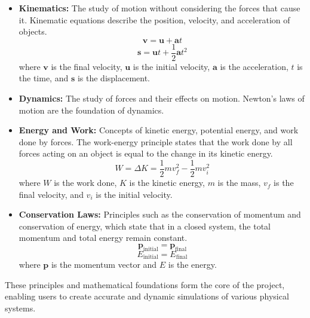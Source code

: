 \begin{itemize}
    \item \textbf{Kinematics:} The study of motion without considering the forces that cause it. Kinematic equations describe the position, velocity, and acceleration of objects.
    \begin{equation}
        \mathbf{v} = \mathbf{u} + \mathbf{a} t
    \end{equation}
    \begin{equation}
        \mathbf{s} = \mathbf{u} t + \frac{1}{2} \mathbf{a} t^2
    \end{equation}
    where \(\mathbf{v}\) is the final velocity, \(\mathbf{u}\) is the initial velocity, \(\mathbf{a}\) is the acceleration, \(t\) is the time, and \(\mathbf{s}\) is the displacement.
    
    \item \textbf{Dynamics:} The study of forces and their effects on motion. Newton's laws of motion are the foundation of dynamics.
    
    \item \textbf{Energy and Work:} Concepts of kinetic energy, potential energy, and work done by forces. The work-energy principle states that the work done by all forces acting on an object is equal to the change in its kinetic energy.
    \begin{equation}
        W = \Delta K = \frac{1}{2} m v_f^2 - \frac{1}{2} m v_i^2
    \end{equation}
    where \(W\) is the work done, \(K\) is the kinetic energy, \(m\) is the mass, \(v_f\) is the final velocity, and \(v_i\) is the initial velocity.
    
    \item \textbf{Conservation Laws:} Principles such as the conservation of momentum and conservation of energy, which state that in a closed system, the total momentum and total energy remain constant.
    \begin{equation}
        \mathbf{p}_{\text{initial}} = \mathbf{p}_{\text{final}}
    \end{equation}
    \begin{equation}
        E_{\text{initial}} = E_{\text{final}}
    \end{equation}
    where \(\mathbf{p}\) is the momentum vector and \(E\) is the energy.
\end{itemize}

These principles and mathematical foundations form the core of the project, enabling users to create accurate and dynamic simulations of various physical systems.
